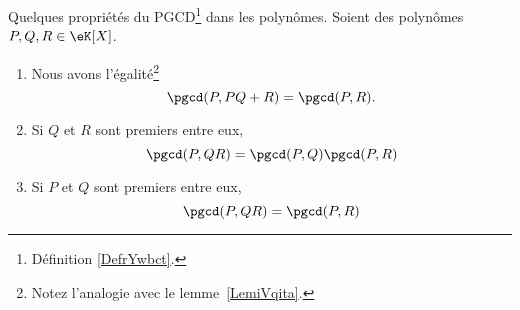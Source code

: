 \begin{lemma}   \label{LemUELTuwK}
	Quelques propriétés du PGCD\footnote{Définition \ref{DefrYwbct}.} dans les polynômes. Soient des polynômes \( P,Q,R\in \eK[X]\).
	\begin{enumerate}
		\item       \label{ITEMooBPOZooYeFGjl}
		      Nous avons l'égalité\footnote{Notez l'analogie avec le lemme~\ref{LemiVqita}.}
		      \begin{equation}
			      \pgcd(P,PQ+R)=\pgcd(P,R).
		      \end{equation}
		\item       \label{ITEMooUVGRooNSGDZn}
		      Si \( Q \) et \( R\) sont premiers entre eux,
		      \begin{equation}
			      \pgcd(P,QR)=\pgcd(P,Q)\pgcd(P,R)
		      \end{equation}
		\item       \label{ITEMooYXAHooXibkgV}
		      Si \( P\) et \( Q\) sont premiers entre eux,
		      \begin{equation}
			      \pgcd(P,QR)=\pgcd(P,R)
		      \end{equation}
	\end{enumerate}
\end{lemma}

